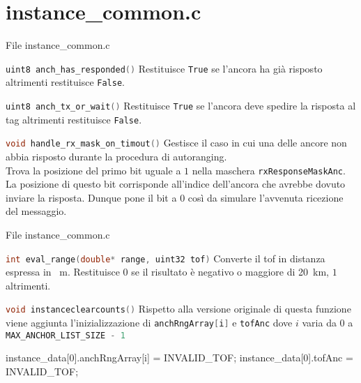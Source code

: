 \section{instance\_common.c}
\begin{frame}{File instance\_common.c}%
  \begin{block}{\lstinline[language=C]!uint8 anch_has_responded()! \newfunction}
    Restituisce \lstinline[language=C]!True! se l'ancora ha già risposto altrimenti restituisce \lstinline[language=C]!False!.
  \end{block}
  \begin{block}{\lstinline[language=C]!uint8 anch_tx_or_wait()! \newfunction}
    Restituisce \lstinline[language=C]!True! se l'ancora deve spedire la risposta al tag altrimenti restituisce \lstinline[language=C]!False!.
  \end{block}
  \begin{block}{\lstinline[language=C]!void handle_rx_mask_on_timout()! \newfunction}
    Gestisce il caso in cui una delle ancore non abbia risposto durante la procedura di autoranging.\\
    Trova la posizione del primo bit uguale a $1$ nella maschera \lstinline[language=C]!rxResponseMaskAnc!. La posizione di questo bit corrisponde all'indice dell'ancora che avrebbe
    dovuto inviare la risposta. Dunque pone il bit a $0$ così da simulare l'avvenuta ricezione del messaggio.
  \end{block}
\end{frame}

\begin{frame}[fragile]{File instance\_common.c}
  \begin{block}{\lstinline[language=C]!int eval_range(double* range, uint32 tof)! \newfunction}
    Converte il tof in distanza espressa in \SI{}{\meter}. Restituisce $0$ se il risultato è negativo o maggiore di \SI{20}{\kilo\meter}, 
    $1$ altrimenti.
  \end{block}
  \begin{block}{\lstinline[language=C]!void instanceclearcounts()! \oldfunction}
    Rispetto alla versione originale di questa funzione viene aggiunta l'inizializzazione di \lstinline[language=C]!anchRngArray[i]! e \lstinline[language=C]!tofAnc!
    dove $i$ varia da $0$ a \lstinline[language=C]!MAX_ANCHOR_LIST_SIZE - 1!
    \begin{C}
      instance_data[0].anchRngArray[i] = INVALID_TOF;
      instance_data[0].tofAnc = INVALID_TOF;
    \end{C}
  \end{block}
\end{frame}


